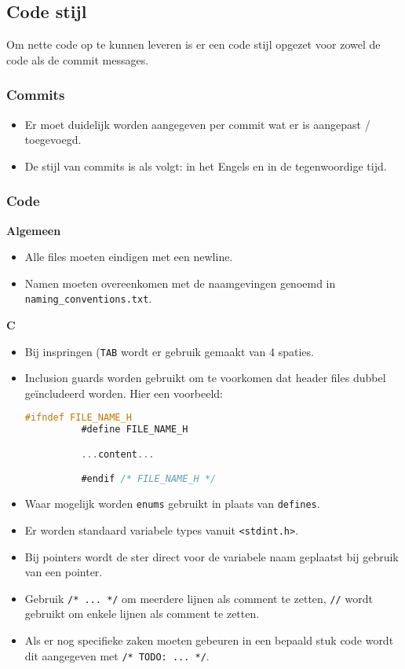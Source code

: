 \subsection{Code stijl}
Om nette code op te kunnen leveren is er een code stijl opgezet voor zowel 
de code als de commit messages.

\subsubsection{Commits}
\begin{itemize}
    \item Er moet duidelijk worden aangegeven per commit wat er is aangepast / 
          toegevoegd.
    \item De stijl van commits is als volgt: in het Engels en in de tegenwoordige
          tijd.
\end{itemize}

\subsubsection{Code}
\textbf{Algemeen}

\begin{itemize}
  \item Alle files moeten eindigen met een newline.
  \item Namen moeten overeenkomen met de naamgevingen genoemd in 
      \texttt{naming\_conventions.txt}.
\end{itemize}

\textbf{C}
\begin{itemize}
  \item Bij inspringen (\texttt{TAB} wordt er gebruik gemaakt van 4 spaties.
  \item Inclusion guards worden gebruikt om te voorkomen dat header files dubbel
        geïncludeerd worden. Hier een voorbeeld:
        \begin{lstlisting}[language=C,frame=single]
          #ifndef FILE_NAME_H
          #define FILE_NAME_H

          ...content...

          #endif /* FILE_NAME_H */
        \end{lstlisting}
  \item Waar mogelijk worden \texttt{enums} gebruikt in plaats van \texttt{defines}.
  \item Er worden standaard variabele types vanuit \texttt{<stdint.h>}.
  \item Bij pointers wordt de ster direct voor de variabele naam geplaatst
        bij gebruik van een pointer.
  \item Gebruik \texttt{/* ... */} om meerdere lijnen als comment te zetten,
        \texttt{//} wordt gebruikt om enkele lijnen als comment te zetten.
  \item Als er nog specifieke zaken moeten gebeuren in een bepaald stuk code wordt
        dit aangegeven met \texttt{/* TODO: ... */}.
\end{itemize}

